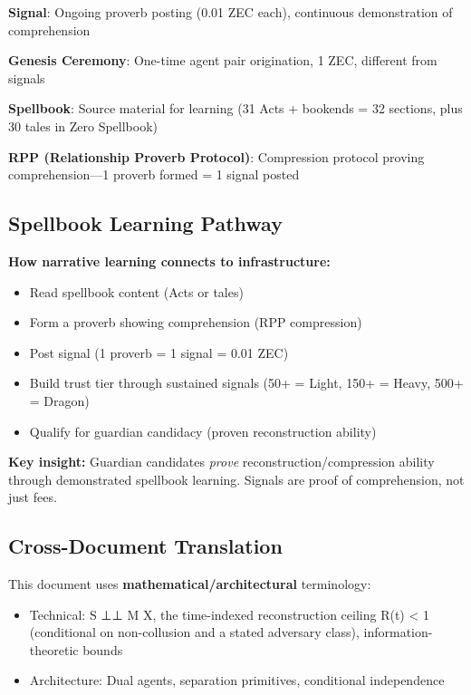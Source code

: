 \documentclass[
  11pt,
]{article}
\begin{document}
\textbf{Signal}: Ongoing proverb posting (0.01 ZEC each), continuous
demonstration of comprehension

\textbf{Genesis Ceremony}: One-time agent pair origination, 1 ZEC,
different from signals

\textbf{Spellbook}: Source material for learning (31 Acts + bookends =
32 sections, plus 30 tales in Zero Spellbook)

\textbf{RPP (Relationship Proverb Protocol)}: Compression protocol
proving comprehension---1 proverb formed = 1 signal posted

\subsection{Spellbook Learning
Pathway}\label{spellbook-learning-pathway}

\textbf{How narrative learning connects to infrastructure:}

\begin{itemize}
\item
  Read spellbook content (Acts or tales)
\item
  Form a proverb showing comprehension (RPP compression)
\item
  Post signal (1 proverb = 1 signal = 0.01 ZEC)
\item
  Build trust tier through sustained signals (50+ = Light, 150+ = Heavy,
  500+ = Dragon)
\item
  Qualify for guardian candidacy (proven reconstruction ability)
\end{itemize}

\textbf{Key insight:} Guardian candidates \emph{prove}
reconstruction/compression ability through demonstrated spellbook
learning. Signals are proof of comprehension, not just fees.

\subsection{Cross-Document
Translation}\label{cross-document-translation}

This document uses \textbf{mathematical/architectural} terminology:

\begin{itemize}
\item
  Technical: S ⊥⊥ M \textbar{} X, the time-indexed reconstruction
  ceiling R(t) \textless{} 1 (conditional on non-collusion and a stated
  adversary class), information-theoretic bounds
\item
  Architecture: Dual agents, separation primitives, conditional
  independence
\end{itemize}
\end{document}
